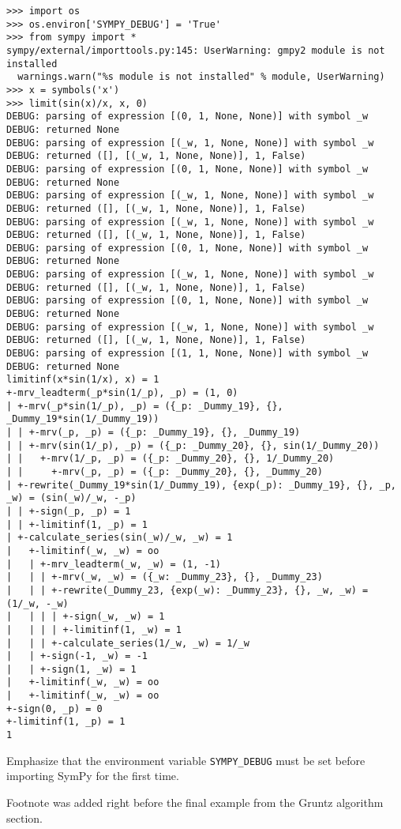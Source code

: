 \documentclass[answers,12pt]{exam}
\begin{document}
\begin{questions}
\begin{verbatim}
>>> import os
>>> os.environ['SYMPY_DEBUG'] = 'True'
>>> from sympy import *
sympy/external/importtools.py:145: UserWarning: gmpy2 module is not installed
  warnings.warn("%s module is not installed" % module, UserWarning)
>>> x = symbols('x')
>>> limit(sin(x)/x, x, 0)
DEBUG: parsing of expression [(0, 1, None, None)] with symbol _w
DEBUG: returned None
DEBUG: parsing of expression [(_w, 1, None, None)] with symbol _w
DEBUG: returned ([], [(_w, 1, None, None)], 1, False)
DEBUG: parsing of expression [(0, 1, None, None)] with symbol _w
DEBUG: returned None
DEBUG: parsing of expression [(_w, 1, None, None)] with symbol _w
DEBUG: returned ([], [(_w, 1, None, None)], 1, False)
DEBUG: parsing of expression [(_w, 1, None, None)] with symbol _w
DEBUG: returned ([], [(_w, 1, None, None)], 1, False)
DEBUG: parsing of expression [(0, 1, None, None)] with symbol _w
DEBUG: returned None
DEBUG: parsing of expression [(_w, 1, None, None)] with symbol _w
DEBUG: returned ([], [(_w, 1, None, None)], 1, False)
DEBUG: parsing of expression [(0, 1, None, None)] with symbol _w
DEBUG: returned None
DEBUG: parsing of expression [(_w, 1, None, None)] with symbol _w
DEBUG: returned ([], [(_w, 1, None, None)], 1, False)
DEBUG: parsing of expression [(1, 1, None, None)] with symbol _w
DEBUG: returned None
limitinf(x*sin(1/x), x) = 1
+-mrv_leadterm(_p*sin(1/_p), _p) = (1, 0)
| +-mrv(_p*sin(1/_p), _p) = ({_p: _Dummy_19}, {}, _Dummy_19*sin(1/_Dummy_19))
| | +-mrv(_p, _p) = ({_p: _Dummy_19}, {}, _Dummy_19)
| | +-mrv(sin(1/_p), _p) = ({_p: _Dummy_20}, {}, sin(1/_Dummy_20))
| |   +-mrv(1/_p, _p) = ({_p: _Dummy_20}, {}, 1/_Dummy_20)
| |     +-mrv(_p, _p) = ({_p: _Dummy_20}, {}, _Dummy_20)
| +-rewrite(_Dummy_19*sin(1/_Dummy_19), {exp(_p): _Dummy_19}, {}, _p, _w) = (sin(_w)/_w, -_p)
| | +-sign(_p, _p) = 1
| | +-limitinf(1, _p) = 1
| +-calculate_series(sin(_w)/_w, _w) = 1
|   +-limitinf(_w, _w) = oo
|   | +-mrv_leadterm(_w, _w) = (1, -1)
|   | | +-mrv(_w, _w) = ({_w: _Dummy_23}, {}, _Dummy_23)
|   | | +-rewrite(_Dummy_23, {exp(_w): _Dummy_23}, {}, _w, _w) = (1/_w, -_w)
|   | | | +-sign(_w, _w) = 1
|   | | | +-limitinf(1, _w) = 1
|   | | +-calculate_series(1/_w, _w) = 1/_w
|   | +-sign(-1, _w) = -1
|   | +-sign(1, _w) = 1
|   +-limitinf(_w, _w) = oo
|   +-limitinf(_w, _w) = oo
+-sign(0, _p) = 0
+-limitinf(1, _p) = 1
1
\end{verbatim}

Emphasize that the environment variable \texttt{SYMPY\_DEBUG} must be set before importing SymPy for the first time.
\begin{solution}
Footnote was added right before the final example from the Gruntz algorithm section.
\end{solution}


\end{questions}
\end{document}
